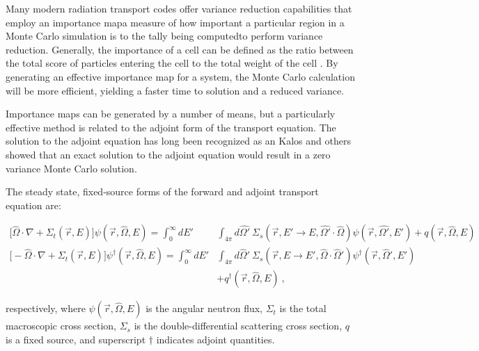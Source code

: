 \documentclass[12pt]{article}
\newcommand{\Macro}{\ensuremath{\Sigma}}
\newcommand{\vOmega}{\ensuremath{\hat{\Omega}}}
\newcommand{\rvec}{\ensuremath{\vec{r}}}
\begin{document}

Many modern radiation transport codes offer variance reduction capabilities that employ an importance map\textemdash a measure of how important a particular region in a Monte Carlo simulation is to the tally being computed\textemdash to perform variance reduction. Generally, the importance of a cell can be defined as the ratio between the total score of particles entering the cell to the total weight of the cell \cite{booth_automatic_1982}. By generating an effective importance map for a system, the Monte Carlo calculation will be more efficient, yielding a faster time to solution and a reduced variance. 

Importance maps can be generated by a number of means, but a particularly effective method is related to the adjoint form of the transport equation. The solution to the adjoint equation has long been recognized as an Kalos \cite{kalos_importance_1963, goertzel_monte_1958} and others showed that an exact solution to the adjoint equation would result in a zero variance Monte Carlo solution. 


The steady state, fixed-source forms of the forward and adjoint transport equation are:

\begin{align*}
\bigl[\hat{\Omega} \cdot \nabla + \Macro_t(\vec{r}, E)\bigr] \psi(\vec{r}, \hat{\Omega}, E)  =  \int_0^{\infty} dE' &\int_{4\pi} d\hat{\Omega'} \:\Macro_{s}(\vec{r}, E' \to E, \hat{\Omega'} \cdot \hat{\Omega}) \psi(\vec{r}, \hat{\Omega'}, E') + q(\vec{r}, \vOmega, E) \\
%
\bigl[-\vOmega \cdot \nabla + \Sigma_t(\rvec, E)\bigr] \psi^{\dagger}(\vec{r}, \vOmega, E) = \int_0^{\infty} dE' &\int_{4\pi} d\vOmega' \: \Sigma_s(\rvec, E \rightarrow E', \vOmega \cdot \vOmega') \psi^{\dagger}(\rvec, \vOmega', E') \\
&+ q^{\dagger}(\vec{r}, \vOmega, E) \:, 
\end{align*}

respectively, where $\psi(\vec{r}, \hat{\Omega}, E)$ is the angular neutron flux, $\Sigma_t$ is the total macroscopic cross section, $\Sigma_s$ is the double-differential scattering cross section, $q$ is a fixed source, and superscript $\dagger$ indicates adjoint quantities. 
\end{document}
